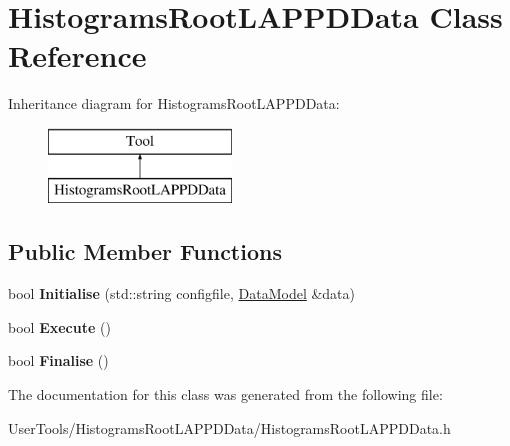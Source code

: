 \hypertarget{classHistogramsRootLAPPDData}{\section{Histograms\-Root\-L\-A\-P\-P\-D\-Data Class Reference}
\label{classHistogramsRootLAPPDData}
}
Inheritance diagram for Histograms\-Root\-L\-A\-P\-P\-D\-Data\-:\begin{figure}[H]
\begin{center}
\leavevmode
\includegraphics[height=2.000000cm]{classHistogramsRootLAPPDData}
\end{center}
\end{figure}
\subsection*{Public Member Functions}
\begin{DoxyCompactItemize}
\item 
\hypertarget{classHistogramsRootLAPPDData_ab87ee19ac23e1a888976464ec0e9b199}{bool {\bfseries Initialise} (std\-::string configfile, \hyperlink{classDataModel}{Data\-Model} \&data)}\label{classHistogramsRootLAPPDData_ab87ee19ac23e1a888976464ec0e9b199}

\item 
\hypertarget{classHistogramsRootLAPPDData_a81c098fc773fb9bb365beb47aefd67d7}{bool {\bfseries Execute} ()}\label{classHistogramsRootLAPPDData_a81c098fc773fb9bb365beb47aefd67d7}

\item 
\hypertarget{classHistogramsRootLAPPDData_abc484166b3afed20afc9a702c3a003da}{bool {\bfseries Finalise} ()}\label{classHistogramsRootLAPPDData_abc484166b3afed20afc9a702c3a003da}

\end{DoxyCompactItemize}


The documentation for this class was generated from the following file\-:\begin{DoxyCompactItemize}
\item 
User\-Tools/\-Histograms\-Root\-L\-A\-P\-P\-D\-Data/Histograms\-Root\-L\-A\-P\-P\-D\-Data.\-h\end{DoxyCompactItemize}

